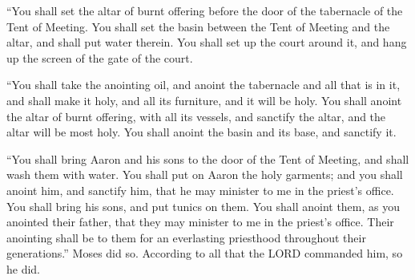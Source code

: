  ``You shall set the altar of burnt offering before the
door of the tabernacle of the Tent of Meeting.  You shall
set the basin between the Tent of Meeting and the altar, and shall put
water therein.  You shall set up the court around it, and
hang up the screen of the gate of the court.

 ``You shall take the anointing oil, and anoint the
tabernacle and all that is in it, and shall make it holy, and all its
furniture, and it will be holy.  You shall anoint the
altar of burnt offering, with all its vessels, and sanctify the altar,
and the altar will be most holy.  You shall anoint the
basin and its base, and sanctify it.

 ``You shall bring Aaron and his sons to the door of the
Tent of Meeting, and shall wash them with water.  You
shall put on Aaron the holy garments; and you shall anoint him, and
sanctify him, that he may minister to me in the priest's office.
 You shall bring his sons, and put tunics on them.
 You shall anoint them, as you anointed their father,
that they may minister to me in the priest's office. Their anointing
shall be to them for an everlasting priesthood throughout their
generations.''  Moses did so. According to all that the
LORD commanded him, so he did.

